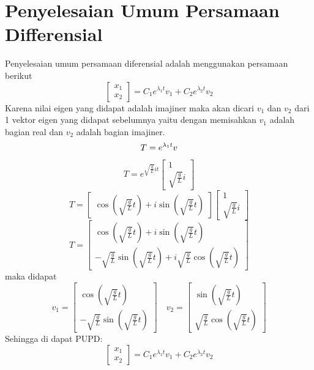 \documentclass{article}
\begin{document}
\section{{Penyelesaian Umum Persamaan Differensial}}
Penyelesaian umum persamaan diferensial adalah menggunakan persamaan berikut
\[
    \begin{bmatrix}
        x_1 \\
        x_2
    \end{bmatrix}
    = C_1e^{{\lambda}_1t}v_1 + C_2e^{{\lambda}_2t}v_2
\]
Karena nilai eigen yang didapat adalah imajiner maka akan dicari $v_1$ dan $v_2$ dari 1 vektor eigen yang didapat sebelumnya yaitu dengan memisahkan $v_1$ adalah bagian real dan $v_2$ adalah bagian imajiner.
\[
    T= e^{{\lambda}_1t}v \\
\]
\[
    T= e^{\sqrt{\frac{g}{L}}it} \begin{bmatrix}
        1 \\
        \sqrt{\frac{g}{L}}i
    \end{bmatrix}
\]
\[
    T= \begin{bmatrix}
        \cos\left({\sqrt{\frac{g}{L}} t}\right) + i \sin\left({\sqrt{\frac{g}{L}} t}\right)
    \end{bmatrix}
    \begin{bmatrix}
        1 \\
        \sqrt{\frac{g}{L}} i
    \end{bmatrix}
\]
\[
    T= \begin{bmatrix}
        \cos\left({\sqrt{\frac{g}{L}} t}\right) + i \sin\left({\sqrt{\frac{g}{L}} t}\right) \\
        -\sqrt{\frac{g}{L}} \sin\left({\sqrt{\frac{g}{L}} t}\right) + i \sqrt{\frac{g}{L}} \cos\left({\sqrt{\frac{g}{L}} t}\right)
    \end{bmatrix}
\]
maka didapat
\[
    v_1= \begin{bmatrix}
        \cos\left({\sqrt{\frac{g}{L}} t}\right) \\
        -\sqrt{\frac{g}{L}} \sin\left({\sqrt{\frac{g}{L}} t}\right)
    \end{bmatrix} \quad v_2 = \begin{bmatrix}
        \sin\left({\sqrt{\frac{g}{L}} t}\right) \\
        \sqrt{\frac{g}{L}} \cos\left({\sqrt{\frac{g}{L}} t}\right)
    \end{bmatrix}
\]
Sehingga di dapat PUPD:
\[
    \begin{bmatrix}
        x_1 \\
        x_2
    \end{bmatrix}
    = C_1e^{{\lambda}_1t}v_1 + C_2e^{{\lambda}_2t}v_2
\]
\end{document}
